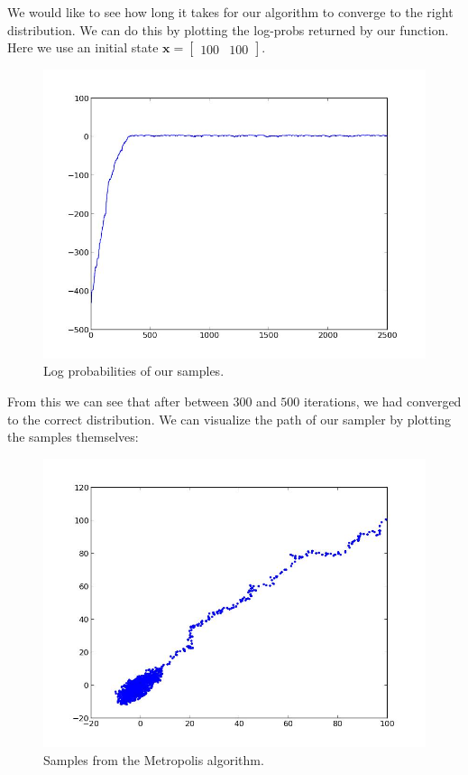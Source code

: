 We would like to see how long it takes for our algorithm to converge to the right distribution. We can do this by plotting the log-probs returned by our function. Here we use an initial state $\mathbf{x} = \left[\begin{array}{cc} 100 & 100 \end{array}\right]$.

\begin{figure}[h]
\centering
\includegraphics[width=\textwidth]{logprobs.jpeg}
\caption{Log probabilities of our samples.}
\end{figure}

From this we can see that after between $300$ and $500$ iterations, we had converged to the correct distribution. We can visualize the path of our sampler by plotting the samples themselves:
\begin{figure}[h]
\centering
\includegraphics[width=\textwidth]{samples.jpeg}
\caption{Samples from the Metropolis algorithm.}
\end{figure}

